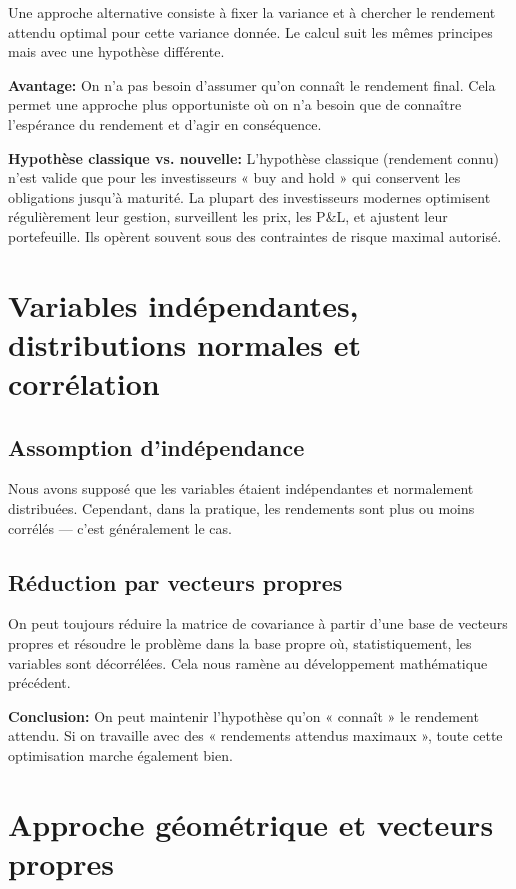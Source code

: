 \documentclass[11pt,a4paper]{article}
\begin{document}
Une approche alternative consiste à fixer la variance et à chercher le rendement attendu optimal pour cette variance donnée. Le calcul suit les mêmes principes mais avec une hypothèse différente.

\textbf{Avantage:} On n'a pas besoin d'assumer qu'on connaît le rendement final. Cela permet une approche plus opportuniste où on n'a besoin que de connaître l'espérance du rendement et d'agir en conséquence.

\textbf{Hypothèse classique vs. nouvelle:} L'hypothèse classique (rendement connu) n'est valide que pour les investisseurs « buy and hold » qui conservent les obligations jusqu'à maturité. La plupart des investisseurs modernes optimisent régulièrement leur gestion, surveillent les prix, les P\&L, et ajustent leur portefeuille. Ils opèrent souvent sous des contraintes de risque maximal autorisé.

\section{Variables indépendantes, distributions normales et corrélation}

\subsection{Assomption d'indépendance}

Nous avons supposé que les variables étaient indépendantes et normalement distribuées. Cependant, dans la pratique, les rendements sont plus ou moins corrélés — c'est généralement le cas.

\subsection{Réduction par vecteurs propres}

On peut toujours réduire la matrice de covariance à partir d'une base de vecteurs propres et résoudre le problème dans la base propre où, statistiquement, les variables sont décorrélées. Cela nous ramène au développement mathématique précédent.

\textbf{Conclusion:} On peut maintenir l'hypothèse qu'on « connaît » le rendement attendu. Si on travaille avec des « rendements attendus maximaux », toute cette optimisation marche également bien.

\section{Approche géométrique et vecteurs propres}
\end{document}
